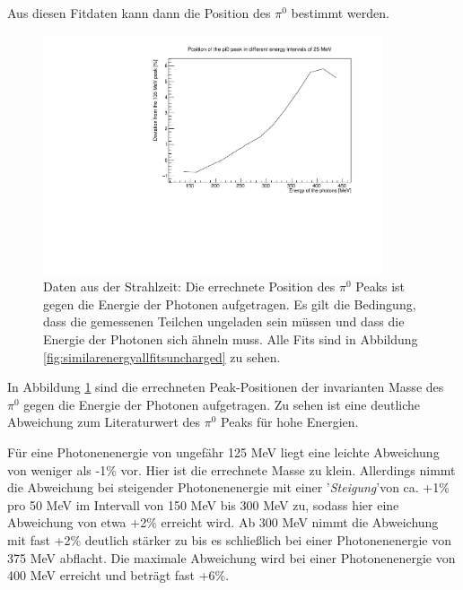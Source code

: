 \documentclass[a4paper,11pt,oneside,final,german,openbib,pdftex]{scrbook}
\begin{document}
{ %
 
 Aus diesen Fitdaten kann dann die Position des $\pi^0$ bestimmt werden. 
 
 \begin{figure}[h!]
 	\begin{center}
 		\includegraphics[width=100mm]{NewCalib/Strahlzeit2014/20171904RealUnchargedDeviation}
 	
 		\caption[Strahlzeit: Symmetrische Photonen; Abweichung]{Daten aus der Strahlzeit: Die errechnete Position des $\pi^0$ Peaks ist gegen die Energie der Photonen aufgetragen.
 			Es gilt die Bedingung, dass die gemessenen Teilchen ungeladen sein m\"ussen und dass die Energie der Photonen sich \"ahneln muss. Alle Fits sind in Abbildung \ref{fig:similarenergyallfitsuncharged} zu sehen.} 
 		\label{fig.Energydependency_pion}
 	\end{center}
 \end{figure}

In Abbildung \ref{fig.Energydependency_pion} sind die errechneten Peak-Positionen der invarianten Masse des $\pi^0$ gegen die Energie der Photonen aufgetragen. Zu sehen ist eine deutliche Abweichung zum Literaturwert des $\pi^0$ Peaks für hohe Energien. 

F\"ur eine Photonenenergie von ungef\"ahr 125 MeV liegt eine leichte Abweichung von weniger als -1\% vor. Hier ist die errechnete Masse zu klein. Allerdings nimmt die Abweichung bei steigender Photonenenergie mit einer '\textit{Steigung}'von ca. +1\% pro 50 MeV im Intervall von 150 MeV bis 300 MeV zu, sodass hier eine Abweichung von etwa +2\% erreicht wird. Ab 300 MeV nimmt die Abweichung mit fast +2\% deutlich st\"arker zu bis es schlie{\ss}lich bei einer Photonenenergie von 375 MeV abflacht. Die maximale Abweichung wird bei einer Photonenenergie von 400 MeV erreicht und betr\"agt fast +6\%.


}
\end{document}
